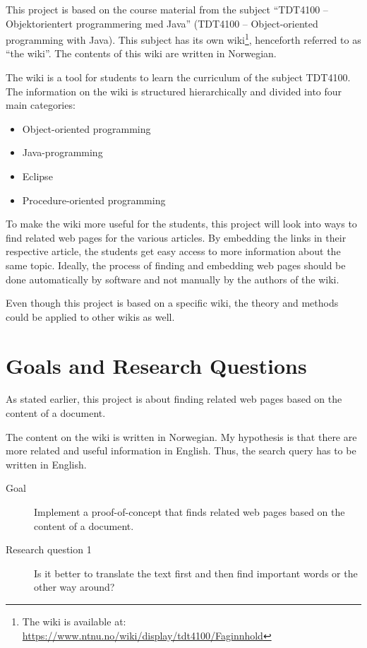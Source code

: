 \documentclass[a4paper]{book}
\begin{document}
This project is based on the course material from the subject ``TDT4100 -- Objektorientert programmering med Java'' (TDT4100 -- Object-oriented programming with Java). This subject has its own wiki\footnote{The wiki is available at: \url{https://www.ntnu.no/wiki/display/tdt4100/Faginnhold}}, henceforth referred to as ``the wiki''. The contents of this wiki are written in Norwegian.

The wiki is a tool for students to learn the curriculum of the subject TDT4100. The information on the wiki is structured hierarchically and divided into four main categories:
\begin{itemize}
\item Object-oriented programming
\item Java-programming
\item Eclipse
\item Procedure-oriented programming
\end{itemize}

To make the wiki more useful for the students, this project will look into ways to find related web pages for the various articles. By embedding the links in their respective article, the students get easy access to more information about the same topic. Ideally, the process of finding and embedding web pages should be done automatically by software and not manually by the authors of the wiki.

Even though this project is based on a specific wiki, the theory and methods could be applied to other wikis as well.

\section{Goals and Research Questions}
\label{sec:goalsAndResearchQuestions}

As stated earlier, this project is about finding related web pages based on the content of a document.

The content on the wiki is written in Norwegian. My hypothesis is that there are more related and useful information in English. Thus, the search query has to be written in English.

\begin{description}
\item[Goal]
Implement a proof-of-concept that finds related web pages based on the content of a document.
\end{description}

\begin{description}
\item[Research question 1]
Is it better to translate the text first and then find important words or the other way around?
\end{description}
\end{document}
